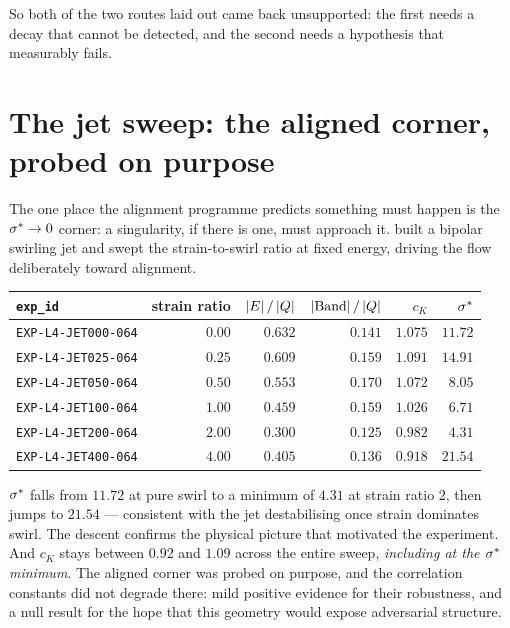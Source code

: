 So both of the two routes  laid out came back unsupported: the first
needs a decay that cannot be detected, and the second needs a hypothesis that
measurably fails.

\section{The jet sweep: the aligned corner, probed on purpose}
\label{sec:jet-sweep}

The one place the alignment programme predicts something must happen is the
\(\sigma^{*}\to0\) corner: a singularity, if there is one, must approach it.
 built a bipolar swirling jet and swept the strain-to-swirl ratio at
fixed energy, driving the flow deliberately toward alignment.

\begin{center}
\small
\begin{tabular}{@{}l r r r r r@{}}
\toprule
\texttt{exp\_id} & strain ratio & \(\left|E\right|/\left|Q\right|\) &
\(\left|\mathrm{Band}\right|/\left|Q\right|\) & \(c_K\) & \(\sigma^{*}\) \\
\midrule
\texttt{EXP-L4-JET000-064} & \(0.00\) & \(0.632\) & \(0.141\) & \(1.075\) & \(11.72\) \\
\texttt{EXP-L4-JET025-064} & \(0.25\) & \(0.609\) & \(0.159\) & \(1.091\) & \(14.91\) \\
\texttt{EXP-L4-JET050-064} & \(0.50\) & \(0.553\) & \(0.170\) & \(1.072\) & \(8.05\) \\
\texttt{EXP-L4-JET100-064} & \(1.00\) & \(0.459\) & \(0.159\) & \(1.026\) & \(6.71\) \\
\texttt{EXP-L4-JET200-064} & \(2.00\) & \(0.300\) & \(0.125\) & \(0.982\) & \(\mathbf{4.31}\) \\
\texttt{EXP-L4-JET400-064} & \(4.00\) & \(0.405\) & \(0.136\) & \(0.918\) & \(21.54\) \\
\bottomrule
\end{tabular}
\end{center}

\medskip
\(\sigma^{*}\) falls from \(11.72\) at pure swirl to a minimum of \(4.31\) at
strain ratio \(2\), then jumps to \(21.54\) --- consistent with the jet
destabilising once strain dominates swirl. The descent confirms the physical
picture that motivated the experiment. And \(c_K\) stays between \(0.92\) and
\(1.09\) across the entire sweep, \emph{including at the \(\sigma^{*}\)
minimum}. The aligned corner was probed on purpose, and the correlation
constants did not degrade there: mild positive evidence for their robustness,
and a null result for the hope that this geometry would expose adversarial
structure.

